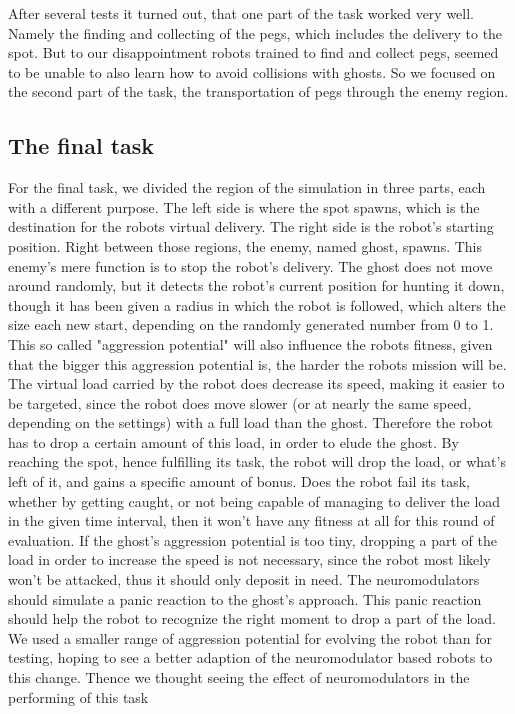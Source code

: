 \documentclass[12pt,fleqn,a4paper]{article}
\begin{document}
After several tests it turned out, that one part of the task worked very well. Namely the finding and collecting of the pegs, which includes the delivery to the spot. But to our disappointment robots trained to find and collect pegs, seemed to be unable to also learn how to avoid collisions with ghosts. So we focused on the second part of the task, the transportation of pegs through the enemy region.

\subsection{The final task}
For the final task, we divided the region of the simulation in three parts, each with a different purpose. The left side is where the spot spawns, which is the destination for the robots virtual delivery. The right side is the robot's
starting position. Right between those regions, the enemy, named ghost, spawns. This enemy's mere function is to stop the robot's delivery. The ghost does not move around randomly, but it detects the robot's current position for hunting it down, though it has been given a radius in which the robot is followed, which alters the size each new start, depending on the randomly generated number from 0 to 1. This so called "aggression potential" will also influence the robots fitness, given that the bigger this aggression potential is, the harder the robots mission will be. The virtual load carried by the robot does decrease its speed, making it easier to be targeted, since the robot does move slower (or at nearly the same speed, depending on the settings) with a full load than the ghost. Therefore the robot has to drop a certain amount of this load, in order to elude the ghost. By reaching the spot, hence fulfilling its task, the robot will drop the load, or what's left of it, and gains a specific amount of bonus. Does the robot fail its task, whether by getting caught, or not being capable of managing to deliver the load in the given time interval, then it won't have any fitness at all for this round of evaluation. If the ghost's aggression potential is too tiny, dropping a part of the load in order to increase the speed is not necessary, since the robot most likely won't be attacked, thus it should only deposit in need. 
The neuromodulators should simulate a panic reaction to the ghost's approach. This panic reaction should help the robot to recognize the right moment to drop a part of the load.
We used a smaller range of aggression potential for evolving the robot than for testing, hoping to see a better adaption of the neuromodulator based robots to this change.
Thence we thought seeing the effect of neuromodulators in the performing of this task
\end{document}
